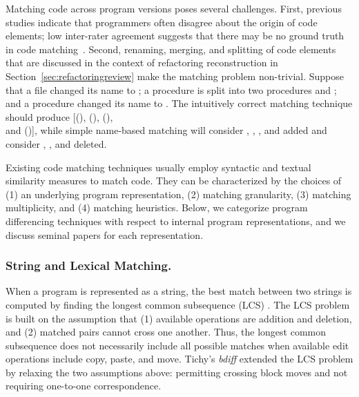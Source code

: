 Matching code across program versions poses several challenges. First, previous studies indicate that programmers often disagree about the origin of code elements; low inter-rater agreement suggests that there may be no ground truth in code matching~\cite{SKim2005}. Second, renaming, merging, and splitting of code elements that are discussed in the context of refactoring reconstruction in Section~\ref{sec:refactoringreview} make the matching problem non-trivial. Suppose that a file  changed its name to ; a procedure  is split into two procedures  and ; and a procedure  changed its name to . The intuitively correct matching technique should produce [(), (), (), \\and ()], while simple name-based matching will consider , , , and  added and consider , , and  deleted.

Existing code matching techniques usually employ syntactic and textual similarity measures to match code. They can be characterized by the choices of (1) an underlying program representation, (2) matching granularity, (3) matching multiplicity, and (4) matching heuristics. Below, we categorize program differencing techniques with respect to internal program representations, and we discuss seminal papers for each representation.

\subsubsection{String and Lexical Matching.}
When a program is represented as a string, the best match between two strings is computed by finding the longest common subsequence (LCS) \cite{Apostolico1997}. The LCS problem is built on the assumption that (1) available operations are addition and deletion, and (2) matched pairs cannot cross one another. Thus, the longest common subsequence does not necessarily include all possible matches when available edit operations include copy, paste, and move. Tichy's \textit{bdiff} \cite{Tichy1984} extended the LCS problem by relaxing the two assumptions above: permitting crossing block moves and not requiring one-to-one correspondence. 


